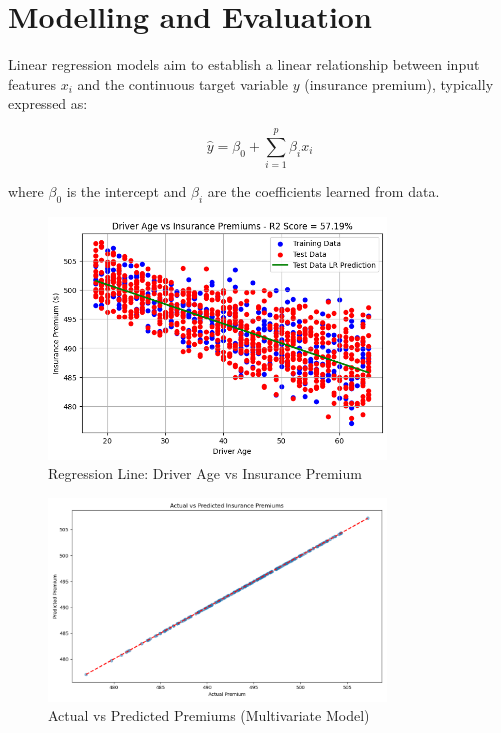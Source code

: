 \documentclass{article}
\begin{document}
\newpage
\section{Modelling and Evaluation}

Linear regression models aim to establish a linear relationship between input features $x_i$ and the continuous target variable $y$ (insurance premium), typically expressed as:

$$
\hat{y} = \beta_0 + \sum_{i=1}^p \beta_i x_i
$$

where $\beta_0$ is the intercept and $\beta_i$ are the coefficients learned from data\cite{hastie_09_elements-of.statistical-learning}.



\begin{figure}[h]
\centering
\includegraphics[width=0.8\textwidth]{age_insurance_LR.png}
\caption{Regression Line: Driver Age vs Insurance Premium}\label{fig:regression_age}
\end{figure}

\begin{figure}[h]
\centering
\includegraphics[width=0.8\textwidth]{actual_vs_predicted.png}
\caption{Actual vs Predicted Premiums (Multivariate Model)}\label{fig:multivariate_regression}
\end{figure}
\end{document}
